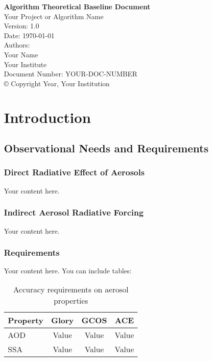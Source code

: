 \documentclass[11pt,a4paper]{article}
\begin{document}
\begin{titlepage}
\centering
{\LARGE \textbf{Algorithm Theoretical Baseline Document}}\\[1cm]
{\Large Your Project or Algorithm Name}\\[0.5cm]
Version: 1.0\\
Date: \today\\[2cm]

{\large Authors:}\\[0.5cm]
Your Name\\
Your Institute\\[2cm]

{\large Document Number: YOUR-DOC-NUMBER}\\[1cm]
\vfill
{\small © Copyright Year, Your Institution}
\end{titlepage}

\tableofcontents
\newpage

\section{Introduction}
\subsection{Observational Needs and Requirements}
\subsubsection{Direct Radiative Effect of Aerosols}
Your content here.

\subsubsection{Indirect Aerosol Radiative Forcing}
Your content here.

\subsubsection{Requirements}
Your content here. You can include tables:
\begin{table}[h!]
\centering
\begin{tabular}{lccc}
\toprule
Property & Glory & GCOS & ACE \\
\midrule
AOD & Value & Value & Value \\
SSA & Value & Value & Value \\
\bottomrule
\end{tabular}
\caption{Accuracy requirements on aerosol properties}
\end{table}
\end{document}
